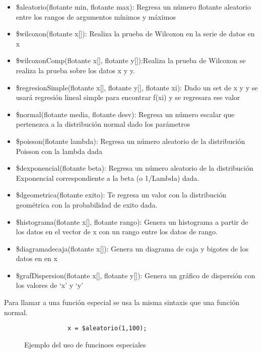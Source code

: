 \begin{itemize}
    \item \$aleatorio(flotante min, flotante max): Regresa un número flotante aleatorio entre los rangos de argumentos mínimos y máximos
    \item \$wilcoxon(flotante x[]): Realiza la prueba de Wilcoxon en la serie de datos en x
    \item \$wilcoxonComp(flotante x[], flotante y[]):Realiza la prueba de Wilcoxon se realiza la prueba sobre los datos x y y.
    \item \$regresionSimple(flotante x[], flotante y[], flotante xi): Dado un set de x y y se usará regresión lineal simple para encontrar f(xi) y se regresara ese valor
    \item \$normal(flotante media, flotante desv): Regresa un número escalar que pertenezca a la distribución normal dado los parámetros
    \item \$poisson(flotante lambda): Regresa un número aleatorio de la distribución Poisson con la lambda dada
    \item \$dexponencial(flotante beta): Regresa un número aleatorio de la distribución Exponencial correspondiente a la beta (o 1/Lambda) dada.
    \item \$dgeometrica(flotante exito): Te regresa un valor con la distribución geométrica con la probabilidad de exito dada. 
    \item \$histograma(flotante x[], flotante rango): Genera un histograma a partir de los datos en el vector de x con un rango entre los datos de rango.
    \item \$diagramadecaja(flotante x[]): Genera un diagrama de caja y bigotes de los datos en en x
    \item \$grafDispersion(flotante x[], flotante y[]): Genera un gráfico de dispersión con los valores de ‘x’ y ‘y’
\end{itemize}

Para llamar a una función especial se usa la misma sintaxis que una función normal.

\begin{figure}[!htbp]
    \centering
    
    \begin{lstlisting}
            x = $aleatorio(1,100);
    \end{lstlisting}
    \caption{Ejemplo del uso de funcinoes especiales}
\end{figure}
\FloatBarrier

\FloatBarrier



